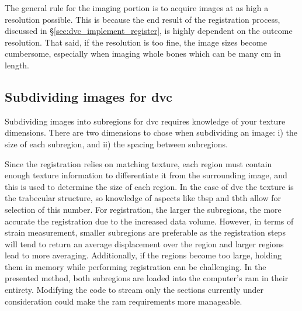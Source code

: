 The general rule for the imaging portion is to acquire images at as high a resolution possible.
This is because the end result of the registration process, discussed in \S\ref{sec:dvc_implement_register}, is highly dependent on the outcome resolution.
That said, if the resolution is too fine, the image sizes become cumbersome, especially when imaging whole bones which can be many \acl{cm} in length.

\subsection{Subdividing images for \acs*{dvc}}
\label{sec:dvc_implement_subdivide}
Subdividing images into subregions for \ac{dvc} requires knowledge of your texture dimensions.
There are two dimensions to chose when subdividing an image: i) the size of each subregion, and ii) the spacing between subregions.

Since the registration relies on matching texture, each region must contain enough texture information to differentiate it from the surrounding image, and this is used to determine the size of each region.
In the case of \ac{dvc} the texture is the trabecular structure, so knowledge of aspects like \acl{tbsp} and \acl{tbth} allow for selection of this number.
For registration, the larger the subregions, the more accurate the registration due to the increased data volume.
However, in terms of strain measurement, smaller subregions are preferable as the registration steps will tend to return an average displacement over the region and larger regions lead to more averaging.
Additionally, if the regions become too large, holding them in memory while performing registration can be challenging.
In the presented method, both subregions are loaded into the computer's \acs{ram} in their entirety.
Modifying the code to stream only the sections currently under consideration could make the \ac{ram} requirements more manageable.


